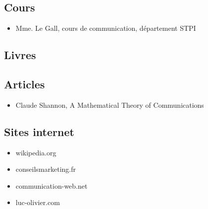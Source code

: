 \subsection{Cours}
\begin{itemize}
	\item Mme. Le Gall, cours de communication, département STPI
\end{itemize}
\subsection{Livres}
\subsection{Articles}
\begin{itemize}
	\item Claude Shannon, A Mathematical Theory of Communications
\end{itemize}
\subsection{Sites internet}
\begin{itemize}
\item wikipedia.org
\item conseilsmarketing.fr
\item communication-web.net
\item luc-olivier.com
\end{itemize}

